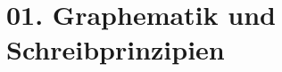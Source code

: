 \documentclass[handout,aspectratio=1610,dvipsnames]{beamer}
\begin{document}
  \section[Graphematik]{01. Graphematik und Schreibprinzipien}
  \let\woopsi\section\let\section\subsection\let\subsection\subsubsection
  
  \let\subsection\section\let\section\woopsi
  
\end{document}
